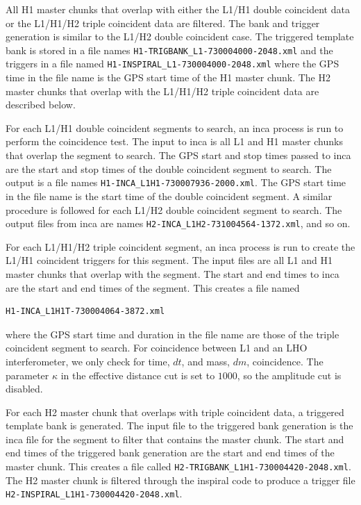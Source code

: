 All H1 master chunks that overlap with either the L1/H1 double coincident data
or the L1/H1/H2 triple coincident data are filtered. The bank and trigger
generation is similar to the L1/H2 double coincident case. The triggered
template bank is stored in a file names
\verb|H1-TRIGBANK_L1-730004000-2048.xml| and the triggers in a file named
\verb|H1-INSPIRAL_L1-730004000-2048.xml| where the GPS time in the file name
is the GPS start time of the H1 master chunk. The H2 master chunks that
overlap with the L1/H1/H2 triple coincident data are described below.

For each L1/H1 double coincident segments to search, an inca process is run to
perform the coincidence test. The input to inca is all L1 and H1 master chunks
that overlap the segment to search. The GPS start and stop times passed to
inca are the start and stop times of the double coincident segment to search.
The output is a file names \verb|H1-INCA_L1H1-730007936-2000.xml|. The GPS
start time in the file name is the start time of the double coincident
segment.  A similar procedure is followed for each L1/H2 double coincident
segment to search. The output files from inca are names
\verb|H2-INCA_L1H2-731004564-1372.xml|, and so on.

For each L1/H1/H2 triple coincident segment, an inca process is run to create
the L1/H1 coincident triggers for this segment. The input files are all L1 and
H1 master chunks that overlap with the segment. The start and end times to
inca are the start and end times of the segment. This creates a file named
\begin{verbatim}
H1-INCA_L1H1T-730004064-3872.xml
\end{verbatim}
where the GPS start time and duration in the file name are those of the triple
coincident segment to search.  For coincidence between L1 and an LHO
interferometer, we only check for time, $dt$, and mass, $dm$, coincidence.
The parameter $\kappa$ in the effective distance cut is set to $1000$, so the
amplitude cut is disabled.

For each H2 master chunk that overlaps with triple coincident data, a triggered
template bank is generated. The input file to the triggered bank generation is
the inca file for the segment to filter that contains the master chunk. The
start and end times of the triggered bank generation are the start and end
times of the master chunk. This creates a file called
\verb|H2-TRIGBANK_L1H1-730004420-2048.xml|.  The H2 master chunk is filtered
through the inspiral code to produce a trigger file
\verb|H2-INSPIRAL_L1H1-730004420-2048.xml|.
 
